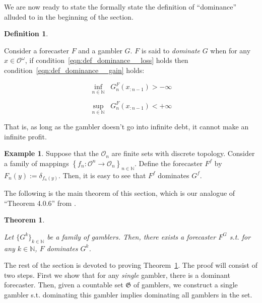 \documentclass[aop,preprint]{imsart}
\numberwithin{equation}{section}
\theoremstyle{definition}
\newtheorem{definition}{Definition}[section]
\newtheorem{example}{Example}[section]
\theoremstyle{plain}
\newtheorem{theorem}{Theorem}[section]
\newcommand{\Nats}{\mathbb{N}}
\newcommand{\Sq}[2]{\{#1\}_{#2 \in \Nats}}
\newcommand{\Ob}{\mathcal{O}}
\newcommand{\OO}{\Ob^\omega}
\newcommand{\GC}{\mathfrak{G}}
\DeclareMathOperator{\SVM}{\Sigma V_{\min}}
\DeclareMathOperator{\SVX}{\Sigma V_{\max}}
\begin{document}
We are now ready to state the formally state the definition of \enquote{dominance} alluded to in the beginning of the section.

\begin{definition}
\label{def:dominance}

Consider a forecaster $F$ and a gambler $G$. $F$ is said to \emph{dominate} $G$ when for any $x \in \OO$, if condition~\ref{eqn:def_dominance__loss} holds then condition~\ref{eqn:def_dominance__gain} holds:

\begin{equation}
\label{eqn:def_dominance__loss}
\inf_{n \in \Nats} {\SVM G^F_{n}\left(x_{:n-1}\right)} > -\infty
\end{equation}

\begin{equation}
\label{eqn:def_dominance__gain}
\sup_{n \in \Nats} {\SVX G^F_{n}\left(x_{:n-1}\right)} < +\infty
\end{equation}

\end{definition}

That is, as long as the gambler doesn't go into infinite debt, it cannot make an infinite profit.

\begin{samepage}
\begin{example}

Suppose that the $\Ob_n$ are finite sets with discrete topology. Consider a family of mappings $\left\{f_n: \Ob^n \rightarrow \Ob_n\right\}_{n\in\Nats}$. Define the forecaster $F^f$ by $F_n(y) := \delta_{f_n(y)}$. Then, it is easy to see that $F^f$ dominates $G^f$.

\end{example}
\end{samepage}

The following is the main theorem of this section, which is our analogue of \enquote{Theorem 4.0.6} from \cite{Garrabrant_2016}.

\begin{theorem}
\label{thm:exist_dominant}

Let $\Sq{G^k}{k}$ be a family of gamblers. Then, there exists a forecaster $F^G$ s.t. for any $k \in \Nats$, $F$ dominates $G^k$.

\end{theorem}

The rest of the section is devoted to proving Theorem~\ref{thm:exist_dominant}. The proof will consist of two steps. First we show that for any \emph{single} gambler, there is a dominant forecaster. Then, given a countable set $\GC$ of gamblers, we construct a single gambler s.t. dominating this gambler implies dominating all gamblers in the set.
\end{document}
